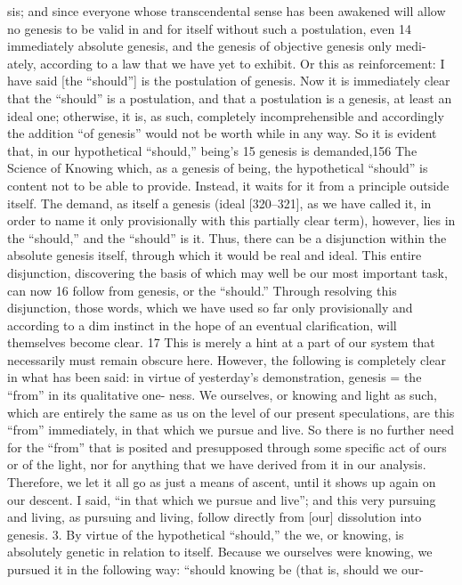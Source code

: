 sis; and since everyone whose transcendental sense has been awakened will
allow no genesis to be valid in and for itself without such a postulation, even 14
immediately absolute genesis, and the genesis of objective genesis only medi-
ately, according to a law that we have yet to exhibit. Or this as reinforcement:
I have said [the “should”] is the postulation of genesis. Now it is immediately
clear that the “should” is a postulation, and that a postulation is a genesis, at
least an ideal one; otherwise, it is, as such, completely incomprehensible and
accordingly the addition “of genesis” would not be worth while in any way. So
it is evident that, in our hypothetical “should,” being’s 15 genesis is demanded,156
The Science of Knowing
which, as a genesis of being, the hypothetical “should” is content not to be able
to provide. Instead, it waits for it from a principle outside itself. The demand,
as itself a genesis (ideal [320–321], as we have called it, in order to name it
only provisionally with this partially clear term), however, lies in the “should,”
and the “should” is it. Thus, there can be a disjunction within the absolute
genesis itself, through which it would be real and ideal. This entire disjunction,
discovering the basis of which may well be our most important task, can now 16
follow from genesis, or the “should.” Through resolving this disjunction, those
words, which we have used so far only provisionally and according to a dim
instinct in the hope of an eventual clarification, will themselves become clear. 17
This is merely a hint at a part of our system that necessarily must remain
obscure here.
However, the following is completely clear in what has been said: in
virtue of yesterday’s demonstration, genesis = the “from” in its qualitative one-
ness. We ourselves, or knowing and light as such, which are entirely the same
as us on the level of our present speculations, are this “from” immediately, in
that which we pursue and live. So there is no further need for the “from” that
is posited and presupposed through some specific act of ours or of the light,
nor for anything that we have derived from it in our analysis. Therefore, we
let it all go as just a means of ascent, until it shows up again on our descent. I
said, “in that which we pursue and live”; and this very pursuing and living, as
pursuing and living, follow directly from [our] dissolution into genesis.
3. By virtue of the hypothetical “should,” the we, or knowing, is
absolutely genetic in relation to itself. Because we ourselves were knowing, we
pursued it in the following way: “should knowing be (that is, should we our-
